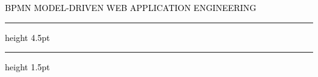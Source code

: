 \begin{center}
\chaptitlefont %
\begin{center}\textcolor{black}{\textsc{BPMN MODEL-DRIVEN WEB APPLICATION ENGINEERING}}
\end{center}
\end{center}
\vspace{8mm}
\textcolor{black}{\hrule height 4.5pt}%
\vspace{1mm}
\textcolor{black}{\hrule height 1.5pt}

